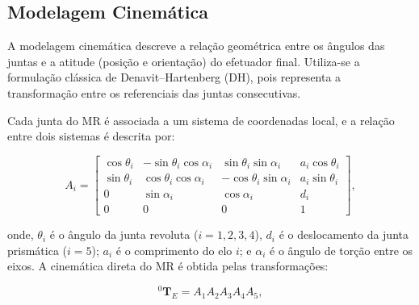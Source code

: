 \subsection{Modelagem Cinemática}
\label{sec:modelagem_cinematica}

A modelagem cinemática descreve a relação geométrica entre os ângulos das juntas e a atitude (posição e orientação) do efetuador final. Utiliza-se a formulação clássica de Denavit--Hartenberg (DH), pois representa a transformação entre os referenciais das juntas consecutivas.

Cada junta do MR é associada a um sistema de coordenadas local, e a relação entre dois sistemas é descrita por:

\begin{equation}
A_i =
\begin{bmatrix}
\cos\theta_i & -\sin\theta_i \cos\alpha_i & \sin\theta_i \sin\alpha_i & a_i \cos\theta_i \\
\sin\theta_i & \cos\theta_i \cos\alpha_i & -\cos\theta_i \sin\alpha_i & a_i \sin\theta_i \\
0 & \sin\alpha_i & \cos\alpha_i & d_i \\
0 & 0 & 0 & 1
\end{bmatrix},
\end{equation}

onde, $\theta_i$ é o ângulo da junta revoluta ($i = 1,2,3,4$), $d_i$ é o deslocamento da junta prismática ($i = 5$); $a_i$ é o comprimento do elo $i$; e $\alpha_i$ é o ângulo de torção entre os eixos.
A cinemática direta do MR é obtida pelas transformações:

\begin{equation}
    \label{eq:matrizes_homogeneas_sucessivas}
{}^0 \mathbf{T}_{E} = A_1 A_2 A_3 A_4 A_5,
\end{equation}

